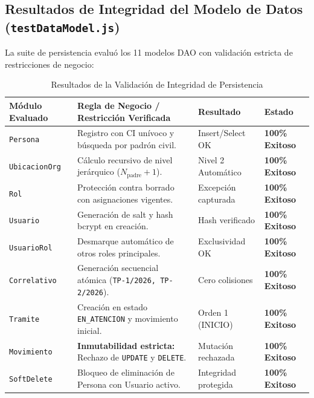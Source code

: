 \documentclass[a4paper,12pt]{article}
\begin{document}
\subsection{Resultados de Integridad del Modelo de Datos (\texttt{testDataModel.js})}
La suite de persistencia evaluó los 11 modelos DAO con validación estricta de restricciones de negocio:
\begin{table}[H]
\centering
\small
\caption{Resultados de la Validación de Integridad de Persistencia}
\label{tab:test_datamodel}
\begin{tabularx}{\linewidth}{@{}>{\raggedright\arraybackslash}p{2.8cm}Y>{\raggedright\arraybackslash}p{3cm}>{\centering\arraybackslash}p{2.5cm}@{}}
\toprule
\textbf{Módulo Evaluado} & \textbf{Regla de Negocio / Restricción Verificada} & \textbf{Resultado} & \textbf{Estado} \\
\midrule
\texttt{Persona} & Registro con CI unívoco y búsqueda por padrón civil. & Insert/Select OK & \textbf{\color{colorExito}100\% Exitoso} \\
\texttt{UbicacionOrg} & Cálculo recursivo de nivel jerárquico ($N_{\text{padre}} + 1$). & Nivel 2 Automático & \textbf{\color{colorExito}100\% Exitoso} \\
\texttt{Rol} & Protección contra borrado con asignaciones vigentes. & Excepción capturada & \textbf{\color{colorExito}100\% Exitoso} \\
\texttt{Usuario} & Generación de salt y hash bcrypt en creación. & Hash verificado & \textbf{\color{colorExito}100\% Exitoso} \\
\texttt{UsuarioRol} & Desmarque automático de otros roles principales. & Exclusividad OK & \textbf{\color{colorExito}100\% Exitoso} \\
\texttt{Correlativo} & Generación secuencial atómica (\texttt{TP-1/2026, TP-2/2026}). & Cero colisiones & \textbf{\color{colorExito}100\% Exitoso} \\
\texttt{Tramite} & Creación en estado \texttt{EN\_ATENCION} y movimiento inicial. & Orden 1 (INICIO) & \textbf{\color{colorExito}100\% Exitoso} \\
\texttt{Movimiento} & \textbf{Inmutabilidad estricta:} Rechazo de \texttt{UPDATE} y \texttt{DELETE}. & Mutación rechazada & \textbf{\color{colorExito}100\% Exitoso} \\
\texttt{SoftDelete} & Bloqueo de eliminación de Persona con Usuario activo. & Integridad protegida & \textbf{\color{colorExito}100\% Exitoso} \\
\bottomrule
\end{tabularx}
\end{table}
\end{document}
